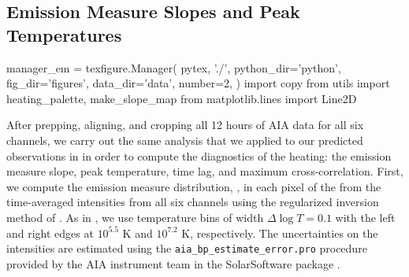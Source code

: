 \subsection{Emission Measure Slopes and Peak Temperatures}\label{sec:em_slopes}

\begin{pycode}[manager_em]
manager_em = texfigure.Manager(
    pytex, './',
    python_dir='python',
    fig_dir='figures',
    data_dir='data',
    number=2,
)
import copy
from utils import heating_palette, make_slope_map
from matplotlib.lines import Line2D
\end{pycode}

After prepping, aligning, and cropping all 12 hours of AIA data for all six channels, we carry out the same analysis that we applied to our predicted observations in  in order to compute the diagnostics of the heating: the emission measure slope, peak temperature, time lag, and maximum cross-correlation.
First, we compute the emission measure distribution, \dem, in each pixel of the \AR{} from the time-averaged intensities from all six channels using the regularized inversion method of \citet{hannah_differential_2012}.
As in , we use temperature bins of width $\Delta\log T=0.1$ with the left and right edges at $10^{5.5}$ K and $10^{7.2}$ K, respectively.
The uncertainties on the intensities are estimated using the \texttt{aia\_bp\_estimate\_error.pro} procedure provided by the AIA instrument team in the SolarSoftware package \citep[SSW,][]{freeland_data_1998}.  

